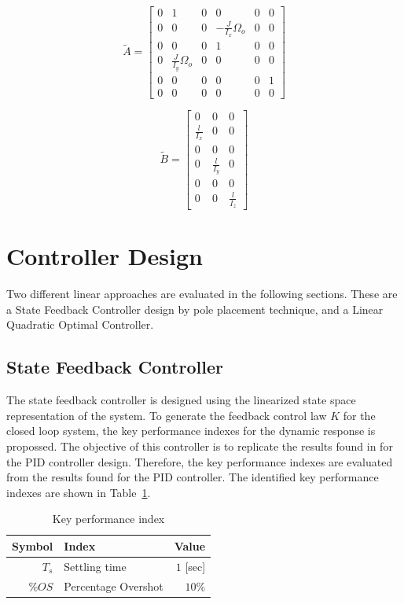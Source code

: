 \documentclass[12pt]{article}
\begin{document}
\begin{equation}
\tilde{A} = 
\begin{bmatrix}
0 & 1 & 0 & 0 & 0 & 0 \\ 
0 & 0 & 0 & -\frac{J}{I_x} \Omega_o & 0 & 0 \\ 
0 & 0 & 0 & 1 & 0 & 0 \\ 
0 & \frac{J}{I_y} \Omega_o & 0 & 0 & 0 & 0 \\ 
0 & 0 & 0 & 0 & 0 & 1 \\ 
0 & 0 & 0 & 0 & 0 & 0
\end{bmatrix}
\end{equation}

\begin{equation}
\tilde{B} = 
\begin{bmatrix}
0 & 0 & 0 \\ 
\frac{l}{I_x} & 0 & 0 \\
0 & 0 & 0 \\ 
0 & \frac{l}{I_y} & 0 \\
0 & 0 & 0 \\ 
0 & 0 & \frac{l}{I_z}
\end{bmatrix}
\end{equation}

\section{Controller Design}

Two different linear approaches are evaluated in the following sections. These are a State Feedback Controller design by pole placement technique, and a Linear Quadratic Optimal Controller.

\subsection{State Feedback Controller}
\label{sec:state-feedback}

The state feedback controller is designed using the linearized state space representation of the system. To generate the feedback control law $K$ for the closed loop system, the key performance indexes for the dynamic response is propossed. The objective of this controller is to replicate the results found in \cite{Boua04} for the PID controller design. Therefore, the key performance indexes are evaluated from the results found for the PID controller. The identified key performance indexes are shown in Table~\ref{tab:KPI}.

\begin{table}
  \begin{center}
    \caption{Key performance index}
    \label{tab:KPI}
    \begin{tabular}{rlr}
      \hline
      Symbol & Index & Value \\
      \hline                  
      $T_s$ & Settling time & $1$ [sec]\\
      $\%OS$ & Percentage Overshot & $10\%$\\
      \hline
    \end{tabular}
  \end{center}
\end{table}
\end{document}
